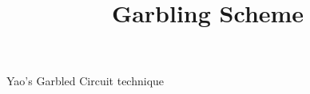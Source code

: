 \documentclass{article}
\title{Garbling Scheme}
\begin{document}
\maketitle

Yao's Garbled Circuit technique

\begin{definition}
\end{definition}



\end{document}
